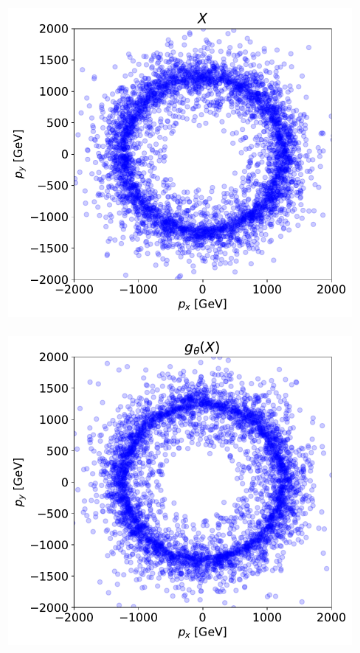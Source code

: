 \begin{figure}
    \centering
    \begin{subfigure}[b]{0.4\textwidth}
        \centering
        \includegraphics[width=\textwidth]{figures/chapter-09/LHCO_Comparison1.pdf}
        \caption{}
        \label{fig:LHCOComparison_i}
    \end{subfigure}
    \hfill
    \begin{subfigure}[b]{0.4\textwidth}
        \centering
        \includegraphics[width=\textwidth]{figures/chapter-09/LHCO_Comparison2.pdf}

\end{subfigure}
\end{figure}
